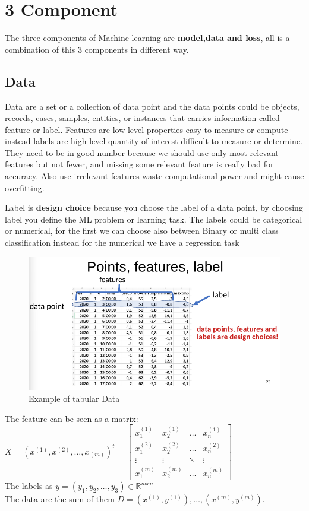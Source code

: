 \chapter{3 Component}
The three components of Machine learning are \textbf{model,data and loss}, all is a combination of this 3 components in different way.

\section{Data}
Data are a set or a collection of data point and the data points could be objects, records, cases, samples, entities, or instances that carries information called feature or label.
Features are low-level properties easy to measure or compute instead labels are high level quantity of interest difficult to measure or determine. They need to be in good number because we should use only most relevant features but not fewer, and missing some relevant feature is really bad for accuracy. Also use irrelevant features waste computational power and might cause overfitting.

Label is \textbf{design choice} because you choose the label of a data point, by choosing label you define the ML problem or learning task. The labels could be categorical or numerical, for the first we can choose also between Binary or multi class classification instead for the numerical we have a regression task
\begin{figure}[H]
    \centering
    \includegraphics[scale=0.4]{images/3Comp/3Comp1.png}
    \caption{Example of tabular Data}
    \label{fig:enter-label}
\end{figure}
The feature can be seen as a matrix: \\
$ X = (x^{(1)} , x^{(2)}, \dots , x_{(m)})^t = \begin{bmatrix}
    x_1^{(1)} & x_2^{(1)} & \dots & x_n^{(1)} \\
    x_1^{(2)} & x_2^{(2)} & \dots & x_n^{(2)} \\
    \vdots & \vdots & \ddots & \vdots \\
    x_1^{(m)} & x_2^{(m)}& \dots &x_n^{(m)}
\end{bmatrix}
$\\
The labels as $y = (y_1, y_2,\dots, y_3 ) \in \mathbb{R}^{mxn}$\\
The data are the sum of them $D = {(x^{(1)} , y^{(1)}), \dots , (x^{(m)} , y^{(m)})}$.


